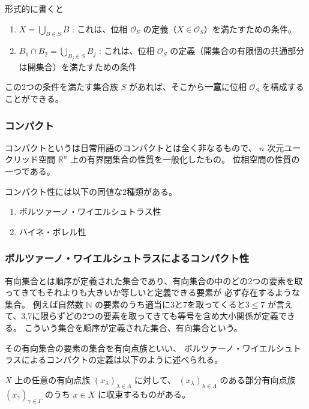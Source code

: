 \documentclass[uplatex,a4j,12pt,dvipdfmx]{jsarticle}
\begin{document}
形式的に書くと

\begin{enumerate}
	\item $X = \bigcup_{B \in S} B$ : これは、位相 $\mathcal{O}_S$ の定義（$X \in \mathcal{O}_S$）を満たすための条件。
	\item $B_1 \cap B_2 = \bigcup_{B_j \in S} B_j$ : これは、位相 $\mathcal{O}_S$ の定義（開集合の有限個の共通部分は開集合）を満たすための条件
\end{enumerate}

この2つの条件を満たす集合族 $S$ があれば、そこから\textbf{一意}に位相 $\mathcal{O}_S$ を構成することができる。

\subsubsection{コンパクト}

コンパクトというは日常用語のコンパクトとは全く非なるもので、
$n$ 次元ユークリッド空間 $\mathbb{R}^{n}$ 上の有界閉集合の性質を一般化したもの。
位相空間の性質の一つである。

コンパクト性には以下の同値な2種類がある。
\begin{enumerate}
	\item ボルツァーノ・ワイエルシュトラス性
	\item ハイネ・ボレル性
\end{enumerate}


\subsubsection{ボルツァーノ・ワイエルシュトラスによるコンパクト性}

有向集合とは順序が定義された集合であり、有向集合の中のどの2つの要素を取ってきてもそれよりも大きいか等しいと定義できる要素が
必ず存在するような集合。
例えば自然数 $\mathbb{N}$ の要素のうち適当に3と7を取ってくると$3 \leq 7$ が言えて、3,7に限らずどの2つの要素を取ってきても等号を含め大小関係が定義できる。
こういう集合を順序が定義された集合、有向集合という。

その有向集合の要素の集合を有向点族といい、
ボルツァーノ・ワイエルシュトラスによるコンパクトの定義は以下のように述べられる。

$X$ 上の任意の有向点族 $(x_{\lambda})_{\lambda \in \Lambda}$ に対して、
$(x_{\lambda})_{\lambda \in \Lambda}$ のある部分有向点族
$(x_{\gamma})_{\gamma \in \Gamma}$ のうち $x \in X$ に収束するものがある。

${}$
\end{document}
